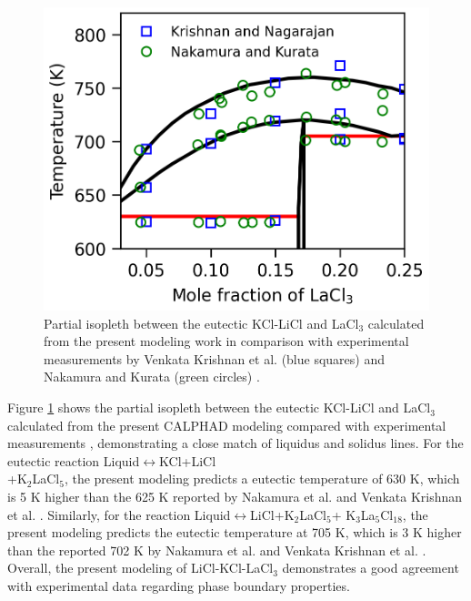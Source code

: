 \begin{figure} [H]
    \centering
    \includegraphics[width=0.6\linewidth]{moltensalts/Moltensalts-Isopleth-LaCl3-LiCl-KCl.png}
    \caption{Partial isopleth between the eutectic KCl-LiCl and LaCl$_3$ calculated from the present modeling work in comparison with experimental measurements by Venkata Krishnan et al. (blue squares) \cite{venkata2006pseudo} and Nakamura and Kurata (green circles) \cite{nakamura1997thermal}.}
    \label{ms:fig:lacl3ternaryisopleth}
\end{figure}

Figure \ref{ms:fig:lacl3ternaryisopleth} shows the partial isopleth between the eutectic KCl-LiCl and LaCl$_3$ calculated from the present CALPHAD modeling compared with experimental measurements \cite{nakamura1997thermal, venkata2006pseudo}, demonstrating a close match of liquidus and solidus lines. For the eutectic reaction Liquid$\leftrightarrow$KCl+LiCl\\+K$_2$LaCl$_5$, the present modeling predicts a eutectic temperature of 630 K, which is 5 K higher than the 625 K reported by Nakamura et al. \cite{nakamura1997thermal} and Venkata Krishnan et al. \cite{venkata2006pseudo}. Similarly, for the reaction Liquid$\leftrightarrow$LiCl+K$_2$LaCl$_5$+ K$_3$La$_5$Cl$_{18}$, the present modeling predicts the eutectic temperature at 705 K, which is 3 K higher than the reported 702 K by Nakamura et al. \cite{nakamura1997thermal} and Venkata Krishnan et al. \cite{venkata2006pseudo}. Overall, the present modeling of LiCl-KCl-LaCl$_3$ demonstrates a good agreement with experimental data \cite{bagri2016determination,samin2016estimation,nakamura1997thermal, venkata2006pseudo} regarding phase boundary properties. 

